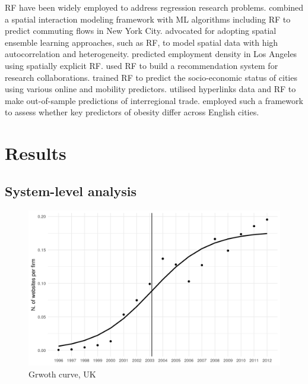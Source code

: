 \documentclass[
  authoryear,
  preprint,
  3p]{elsarticle}
\begin{document}
RF have been widely employed to address regression research problems.
\citet{pourebrahim2019trip} combined a spatial interaction modeling
framework with ML algorithms including RF to predict commuting flows in
New York City. \citet{sinha2019assessing} advocated for adopting spatial
ensemble learning approaches, such as RF, to model spatial data with
high autocorrelation and heterogeneity. \citet{creditspatial} predicted
employment density in Los Angeles using spatially explicit RF.
\citet{guns2014recommending} used RF to build a recommendation system
for research collaborations. \citet{ren2019predicting} trained RF to
predict the socio-economic status of cities using various online and
mobility predictors. \citet{tranos2023using} utilised hyperlinks data
and RF to make out-of-sample predictions of interregional trade.
\citet{zhou2023geography} employed such a framework to assess whether
key predictors of obesity differ across English cities.

\section{Results}\label{sec-results}

\subsection{System-level analysis}\label{system-level-analysis}

\begin{figure}[H]

{\centering \includegraphics[width=1\textwidth,height=\textheight]{../../outputs/s/s_uk_per_firm.png}

}

\caption{\label{s_uk}Grwoth curve, UK}

\end{figure}%
\end{document}
